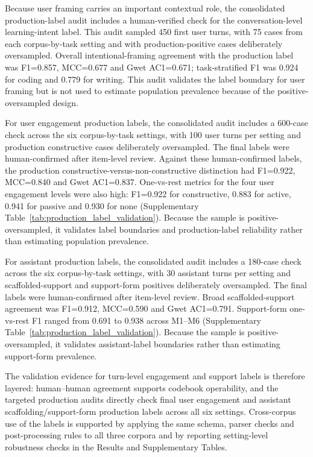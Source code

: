 Because user framing carries an important contextual role, the consolidated production-label audit includes a human-verified check for the conversation-level learning-intent label. This audit sampled 450 first user turns, with 75 cases from each corpus-by-task setting and with production-positive cases deliberately oversampled. Overall intentional-framing agreement with the production label was F1=0.857, MCC=0.677 and Gwet AC1=0.671; task-stratified F1 was 0.924 for coding and 0.779 for writing. This audit validates the label boundary for user framing but is not used to estimate population prevalence because of the positive-oversampled design.

For user engagement production labels, the consolidated audit includes a 600-case check across the six corpus-by-task settings, with 100 user turns per setting and production constructive cases deliberately oversampled. The final labels were human-confirmed after item-level review. Against these human-confirmed labels, the production constructive-versus-non-constructive distinction had F1=0.922, MCC=0.840 and Gwet AC1=0.837. One-vs-rest metrics for the four user engagement levels were also high: F1=0.922 for constructive, 0.883 for active, 0.941 for passive and 0.930 for none (Supplementary Table~\ref{tab:production_label_validation}). Because the sample is positive-oversampled, it validates label boundaries and production-label reliability rather than estimating population prevalence.

For assistant production labels, the consolidated audit includes a 180-case check across the six corpus-by-task settings, with 30 assistant turns per setting and scaffolded-support and support-form positives deliberately oversampled. The final labels were human-confirmed after item-level review. Broad scaffolded-support agreement was F1=0.912, MCC=0.590 and Gwet AC1=0.791. Support-form one-vs-rest F1 ranged from 0.691 to 0.938 across M1--M6 (Supplementary Table~\ref{tab:production_label_validation}). Because the sample is positive-oversampled, it validates assistant-label boundaries rather than estimating support-form prevalence.

The validation evidence for turn-level engagement and support labels is therefore layered: human--human agreement supports codebook operability, and the targeted production audits directly check final user engagement and assistant scaffolding/support-form production labels across all six settings. Cross-corpus use of the labels is supported by applying the same schema, parser checks and post-processing rules to all three corpora and by reporting setting-level robustness checks in the Results and Supplementary Tables.

